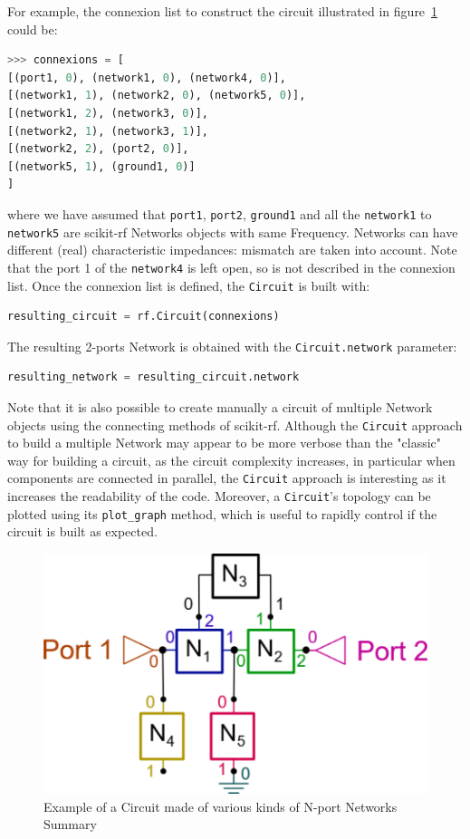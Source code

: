 \documentclass{IEEEjmw}
\begin{document}
For example, the connexion list to construct the circuit illustrated in figure~\ref{fig:circuit} could be:

\begin{lstlisting}[language=Python]
>>> connexions = [
[(port1, 0), (network1, 0), (network4, 0)],
[(network1, 1), (network2, 0), (network5, 0)],
[(network1, 2), (network3, 0)],
[(network2, 1), (network3, 1)],
[(network2, 2), (port2, 0)],
[(network5, 1), (ground1, 0)]
]
\end{lstlisting}

where we have assumed that \texttt{port1}, \texttt{port2}, \texttt{ground1} and all the \texttt{network1} to \texttt{network5} are scikit-rf Networks objects with same Frequency. Networks can have different (real) characteristic impedances: mismatch are taken into account. Note that the port 1 of the \texttt{network4} is left open, so is not described in the connexion list. Once the connexion list is defined, the \texttt{Circuit} is built with:

\begin{lstlisting}[language=Python]
resulting_circuit = rf.Circuit(connexions)
\end{lstlisting}

The resulting 2-ports Network is obtained with the \texttt{Circuit.network} parameter:
\begin{lstlisting}[language=Python]
resulting_network = resulting_circuit.network
\end{lstlisting}

Note that it is also possible to create manually a circuit of multiple Network objects using the connecting methods of scikit-rf. Although the \texttt{Circuit} approach to build a multiple Network may appear to be more verbose than the "classic" way for building a circuit, as the circuit complexity increases, in particular when components are connected in parallel, the \texttt{Circuit} approach is interesting as it increases the readability of the code. Moreover, a \texttt{Circuit}'s topology can be plotted using its \texttt{plot\_graph} method, which is useful to rapidly control if the circuit is built as expected.

\begin{figure}
	\centering
	\includegraphics[width=0.95\linewidth]{figures/circuit}
	\caption{ Example of a Circuit made of various kinds of N-port Networks
		Summary}
	\label{fig:circuit}
\end{figure}
\end{document}
